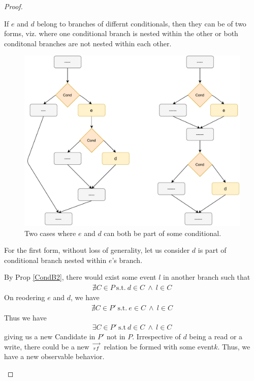 \begin{proof}
\begin{itemize}
                    If $e$ and $d$ belong to branches of differnt conditionals, then they can be of two forms, viz. where one conditional branch is nested within the other or both conditonal branches are not nested within each other.  

                    \begin{figure}[H]
                        \centering 
                        \includegraphics[scale=0.5]{5.InstructionReordering/5.ValidReorderingProgram/ConditionalsProofFig2.pdf}
                        \caption{Two cases where $e$ and $d$ can both be part of some conditional.}
                    \end{figure}

                    For the first form, without loss of generality, let us consider $d$ is part of conditional branch nested within $e$'s branch. 

                    By Prop \ref{CondB2}, there would exist some event $l$ in another branch such that 
                    \begin{align*}
                        \nexists C \in P \ \text{s.t.} \ d \in C \ \wedge \ l \in C 
                    \end{align*}
                    On reodering $e$ and $d$, we have 
                    \begin{align*}
                        \nexists C \in P' \ \text{s.t.} \ e \in C \ \wedge \ l \in C 
                    \end{align*}
                    Thus we have 
                    \begin{align*}
                        \exists C \in P' \ \text{s.t} \ d \in C \ \wedge \ l \in C
                    \end{align*}
                    giving us a new Candidate in $P'$ not in $P$. 
                    Irrespective of $d$ being a read or a write, there could be a new $\stackrel{\longrightarrow}{_{rf}}$ relation be formed with some event$k$. Thus, we have a new observable behavior. 


\end{itemize}
\end{proof}
